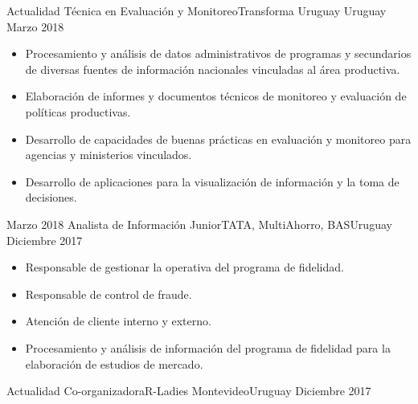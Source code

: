 %
%
%
\begin{experiences}
  \experience
    {Actualidad}   {Técnica en Evaluación y Monitoreo}{Transforma Uruguay} {Uruguay}
    {Marzo 2018} {
                      \begin{itemize}
                        \item Procesamiento y análisis de datos administrativos de programas y secundarios de diversas fuentes de información nacionales vinculadas al área productiva.                    
                        \item Elaboración de informes y documentos técnicos de monitoreo y evaluación de políticas productivas. 
                        
                         \item Desarrollo de capacidades de buenas prácticas en evaluación y monitoreo para agencias y ministerios vinculados.
                              
                        \item Desarrollo de aplicaciones para la visualización de información y la toma de decisiones.
                      \end{itemize}
                    }
                    {}
  \emptySeparator
  \experience
    {Marzo 2018} {Analista de Información Junior}{TATA, MultiAhorro, BAS}{Uruguay}
    {Diciembre 2017}    {
                      \begin{itemize}
                        
                     \item Responsable de gestionar la operativa del programa de fidelidad.
                 
                     \item Responsable de control de fraude.
                     \item Atención de cliente interno y externo.
                     \item Procesamiento y análisis de información del programa de fidelidad para la elaboración de estudios de mercado.  

                      \end{itemize}
                    }
                    {}
\emptySeparator
  \experience
    {Actualidad} {Co-organizadora}{R-Ladies Montevideo}{Uruguay}
    {Diciembre 2017}    {
                      \begin{itemize}
                        

\end{itemize}}
\end{experiences}
